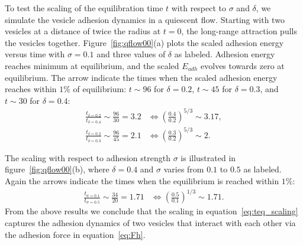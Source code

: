 \documentclass[%
preprint,
 amsmath,amssymb,
 aps,
]{revtex4-1}
\begin{document}
To test the scaling of the equilibration time $t$ with respect to $\sigma$ and $\delta$, we simulate the vesicle adhesion dynamics in a quiescent flow.
Starting with two vesicles at a distance of twice the radius at $t=0$, the long-range attraction pulls the vesicles together. Figure~\ref{fig:qflow00}(a) plots
the scaled adhesion energy versus time with $\sigma=0.1$ and three values of $\delta$ as labeled. 
Adhesion energy reaches minimum at equilibrium, and the scaled $E_{adh}$ evolves towards zero at equilibrium. 
The arrow indicate the times when the scaled adhesion energy
reaches within $1\%$ of equilibrium: $t\sim 96$ for $\delta=0.2$, $t\sim 45$ for $\delta = 0.3$, and $t\sim 30$ for $\delta=0.4$:
\begin{align}
\frac{t_{\delta=0.2}}{t_{\delta=0.4}} \sim \frac{96}{30}=3.2 &\Longleftrightarrow \left(\frac{0.4}{0.2}\right)^{5/3}\sim 3.17,\\
\frac{t_{\delta=0.2}}{t_{\delta=0.3}} \sim \frac{96}{45}=2.1 &\Longleftrightarrow \left(\frac{0.3}{0.2}\right)^{5/3}\sim 2.
\end{align}

The scaling with respect to adhesion strength $\sigma$ is illustrated in figure~\ref{fig:qflow00}(b), where $\delta = 0.4$ and $\sigma$ varies from $0.1$ to $0.5$ as labeled.
Again the arrows indicate the times when the equilibrium is reached within $1\%$:
\begin{align}
\frac{t_{\sigma=0.1}}{t_{\sigma=0.5}} \sim \frac{34}{20} = 1.71 &\Longleftrightarrow \left(\frac{0.5}{0.1}\right)^{1/3}\sim 1.71.
\end{align}
From the above results we conclude that the scaling in equation~\ref{eq:teq_scaling} captures the adhesion dynamics of two vesicles that interact with each other via the adhesion force in equation~\ref{eq:Fh}.
\end{document}
